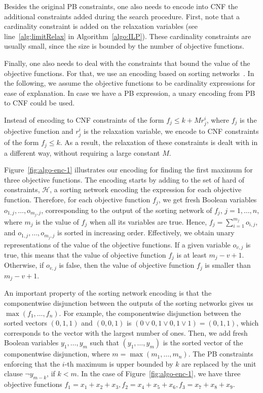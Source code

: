 \documentclass[a4paper,UKenglish,cleveref, autoref, thm-restate]{lipics-v2021}
\begin{document}
Besides the original PB constraints, one also needs to encode into CNF
the additional constraints added during the search procedure. First,
note that a cardinality constraint is added on the relaxation variables
(see line~\ref{alg:limitRelax} in Algorithm~\ref{algo:ILP}). These cardinality constraints are usually small, since the size is bounded
by the number of objective functions. 

Finally, one also needs to deal with the constraints that bound the value
of the objective functions. For that, we use an encoding based on
sorting networks~\cite{knuth1997art,DBLP:journals/jsat/EenS06}. In the following, 
we assume the objective functions to be cardinality expressions
for ease of explanation. In case we have a PB expression, a unary encoding from PB to CNF could be used.

Instead of encoding to CNF constraints of the form $f_j \leq k + Mr^i_j$, where $f_j$ is the objective function and $r^i_j$ is the relaxation variable, we encode to CNF constraints of the form $f_j \leq k$.
As a result, the relaxation of these constraints is dealt with in a different way, without requiring a large constant $M$.

Figure~\ref{fig:algo-enc-1} illustrates our encoding for finding the
first maximum for three objective functions.
The encoding starts by adding to the set of hard of constraints, $\mathcal{H}$, a sorting network encoding the expression for each objective function.
Therefore, for each objective function $f_j$, we get fresh Boolean variables $o_{1,j},\dots,o_{m_j,j}$, corresponding to the output of the sorting network of $f_j$, $j=1,\dots,n$, where $m_j$ is the value of $f_j$ when all its variables are true.
Hence, $f_j=\sum_{i=1}^{m_j} o_{i,j}$, and $o_{1,j},\dots,o_{m_j,j}$ is sorted in increasing order.
Effectively, we obtain unary representations of the value of the objective functions. If a given variable $o_{v,j}$ is true, this means that the value of
objective function $f_j$ is at least $m_j - v + 1$. Otherwise, if $o_{v,j}$ is false,
then the value of objective function $f_j$ is smaller than $m_j - v + 1$.

An important property of the sorting network encoding is that the componentwise disjunction between the outputs of the sorting networks gives us $\max(f_1,\dots,f_n)$. For example, the componentwise disjunction between the sorted vectors $(0,1,1)$ and $(0,0,1)$ is $(0\vee 0, 1 \vee 0, 1 \vee 1)=(0,1,1)$, which corresponds to the vector with the largest number of ones.
Then, we add fresh Boolean variables $y_1,\dots,y_m$ such that $(y_1,\dots,y_m)$ is the sorted vector of the componentwise disjunction, where $m=\max(m_1,\dots,m_n)$.
The PB constraints enforcing that the $i$-th maximum is upper bounded by $k$ are replaced by the unit clause $\neg y_{m-k}$, if $k < m$.
In the case of Figure~\ref{fig:algo-enc-1}, we have three objective functions 
$f_1=x_1+x_2+x_3, f_2=x_4+x_5+x_6, f_3=x_7+x_8+x_9$.
\end{document}
